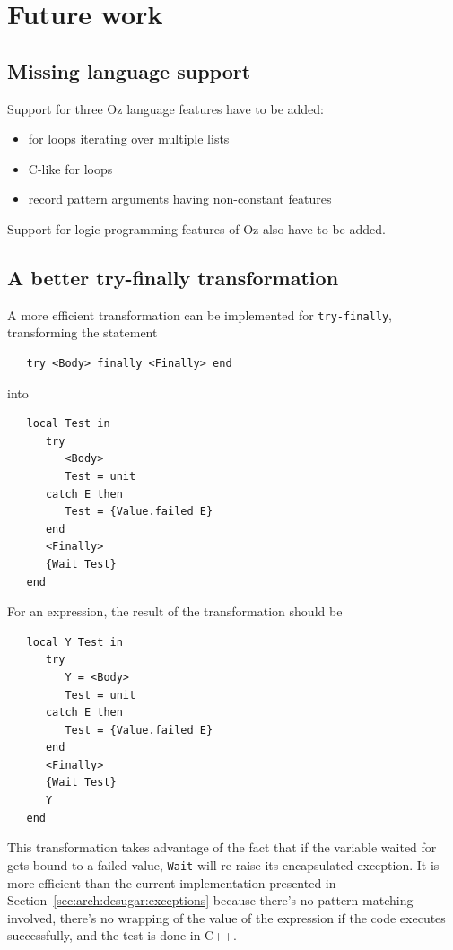 \documentclass[a4paper]{memoir}
\begin{document}
\section{Future work}\label{sec:futurework}
\subsection{Missing language support}
Support for three Oz language features have to be added:
\begin{itemize}
  \item for loops iterating over multiple lists
  \item C-like for loops
  \item record pattern arguments having non-constant features
\end{itemize}

Support for logic programming features of Oz also have to be added.

\subsection{A better try-finally transformation}
A more efficient transformation can be implemented for \lstinline!try-finally!, 
transforming the statement
\begin{lstlisting}
   try <Body> finally <Finally> end
\end{lstlisting}
into
\begin{lstlisting}
   local Test in
      try
         <Body>
         Test = unit
      catch E then
         Test = {Value.failed E}
      end
      <Finally>
      {Wait Test}
   end
\end{lstlisting}

For an expression, the result of the transformation should be
\begin{lstlisting}
   local Y Test in
      try
         Y = <Body>
         Test = unit
      catch E then
         Test = {Value.failed E}
      end
      <Finally>
      {Wait Test}
      Y
   end
\end{lstlisting}
This transformation takes advantage of the fact that if the variable waited for
gets bound to a failed value, \lstinline!Wait! will re-raise its encapsulated
exception. 
It is more efficient than the current implementation presented in Section~\ref{sec:arch:desugar:exceptions} because
there's no pattern matching involved,
there's no wrapping of the value of the expression if the code executes successfully, and the test is done in C++.
\end{document}
